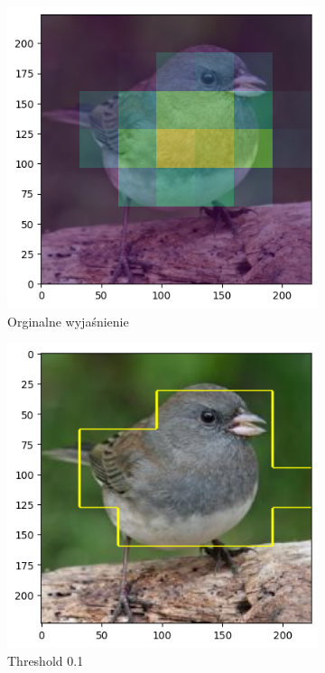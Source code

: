 \begin{figure}[!h]
	\centering
	\begin{subfigure}[b]{0.9\textwidth}
		\centering
		\includegraphics[width=.45\textwidth]{img/parameters/gradcam/threshold_base}
		\caption{Orginalne wyjaśnienie}  \label{rys:parameters_lime_numsamples_5}
	\end{subfigure}
	\begin{subfigure}[b]{0.45\textwidth}
		\centering\includegraphics[width=.9\textwidth]{img/parameters/gradcam/threshold_01}
		\caption{Threshold 0.1}  \label{rys:parameters_lime_numsamples_1000}
	\end{subfigure}
	\begin{subfigure}[b]{0.45\textwidth}

\end{subfigure}
\end{figure}
